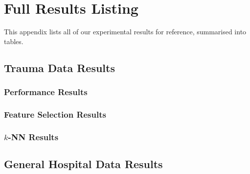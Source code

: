 \chapter{Full Results Listing} \label{app:results}
This appendix lists all of our experimental results for reference, summarised into
tables.

\section{Trauma Data Results}
\subsection{Performance Results}

















\clearpage
\subsection{Feature Selection Results}
\label{app:features-tr}









\clearpage
\subsection{$k$-NN Results}





\clearpage
\section{General Hospital Data Results}
